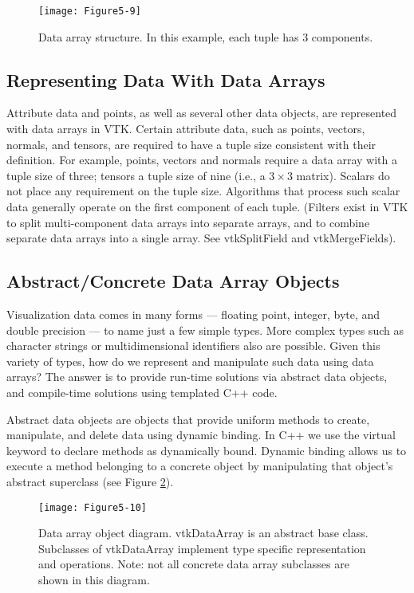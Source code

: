 \begin{figure}[!htb]
	\centering
	\texttt{[image: Figure5-9]}
	\caption{Data array structure. In this example, each tuple has 3 components.}
	\label{fig:Figure5-9}
\end{figure}

\subsection{Representing Data With Data Arrays}

Attribute data and points, as well as several other data objects, are represented with data arrays in VTK. Certain attribute data, such as points, vectors, normals, and tensors, are required to have a tuple size consistent with their definition. For example, points, vectors and normals require a data array with a tuple size of three; tensors a tuple size of nine (i.e., a $3 \times 3$ matrix). Scalars do not place any requirement on the tuple size. Algorithms that process such scalar data generally operate on the first component of each tuple. (Filters exist in VTK to split multi-component data arrays into separate arrays, and to combine separate data arrays into a single array. See vtkSplitField and vtkMergeFields).

\subsection{Abstract/Concrete Data Array Objects}

Visualization data comes in many forms --- floating point, integer, byte, and double precision --- to name just a few simple types. More complex types such as character strings or multidimensional identifiers also are possible. Given this variety of types, how do we represent and manipulate such data using data arrays? The answer is to provide run-time solutions via abstract data objects, and compile-time solutions using templated C++ code.

Abstract data objects are objects that provide uniform methods to create, manipulate, and delete data using dynamic binding. In C++ we use the virtual keyword to declare methods as dynamically bound. Dynamic binding allows us to execute a method belonging to a concrete object by manipulating that object's abstract superclass (see Figure \ref{fig:Figure5-10}).

\begin{figure}[!htb]
	\centering
	\texttt{[image: Figure5-10]}
	\caption{Data array object diagram. vtkDataArray is an abstract base class. Subclasses of vtkDataArray implement type specific representation and operations. Note: not all concrete data array subclasses are shown in this diagram.}
	\label{fig:Figure5-10}
\end{figure}

